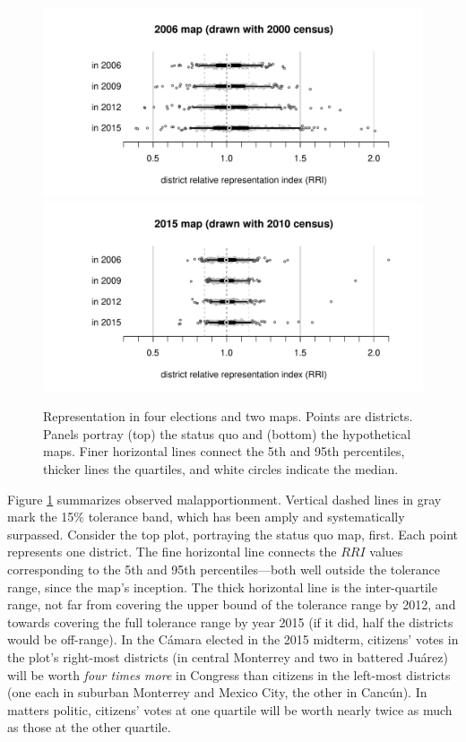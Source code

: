 \documentclass[letter,12pt]{article}
\begin{document}
{%
\begin{figure}
\begin{center}
    \includegraphics[width=.65\columnwidth]{rrin0615d0.pdf} \\
    \includegraphics[width=.65\columnwidth]{rrin0615d3.pdf} \\
\caption{Representation in four elections and two maps. Points are districts. Panels portray (top) the status quo and (bottom) the hypothetical maps. Finer horizontal lines connect the 5th and 95th percentiles, thicker lines the quartiles, and white circles indicate the median.}\label{F:malapp}
\end{center}
\end{figure}

Figure \ref{F:malapp} summarizes observed malapportionment. Vertical dashed lines in gray mark the 15\% tolerance band, which has been amply and systematically surpassed. Consider the top plot, portraying the status quo map, first. Each point represents one district. The fine horizontal line connects the $RRI$ values corresponding to the 5th and 95th percentiles---both well outside the tolerance range, since the map's inception. The thick horizontal line is the inter-quartile range, not far from covering the upper bound of the tolerance range by 2012, and towards covering the full tolerance range by year 2015 (if it did, half the districts would be off-range). In the C\'amara elected in the 2015 midterm, citizens' votes in the plot's right-most districts (in central Monterrey and two in battered Ju\'arez) will be worth \emph{four times more} in Congress than citizens in the left-most districts (one each in suburban Monterrey and Mexico City, the other in Canc\'un). In matters politic, citizens' votes at one quartile will be worth nearly twice as much as those at the other quartile. 

}
\end{document}
